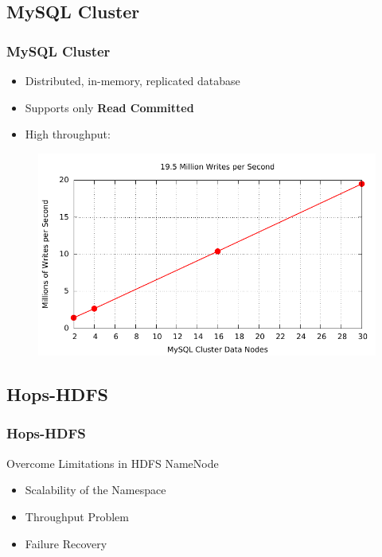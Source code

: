 \documentclass{beamer}
\begin{document}
\subsection{MySQL Cluster}
\begin{frame}
	\frametitle{MySQL Cluster}
	\begin{itemize}
		\item Distributed, in-memory, replicated database
		\item Supports only \textbf{Read Committed}
		\item High throughput:
	\end{itemize}
\begin{figure}[h!]
	\centering
	\includegraphics[scale=0.7]{figs/mysqlclusterbenchmark.pdf}
\end{figure}
\end{frame}

\subsection{Hops-HDFS}
\begin{frame}
	\frametitle{Hops-HDFS}
		\begin{block}{Overcome Limitations in HDFS NameNode}
			\begin{itemize}
				\item Scalability of the Namespace  
				\item Throughput Problem
				\item Failure Recovery
			\end{itemize}
		\end{block}
\end{frame}
\end{document}
